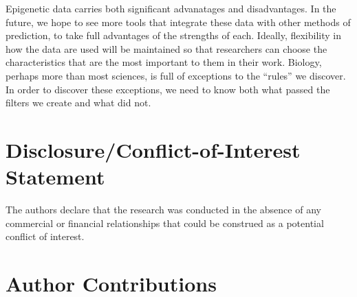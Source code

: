 \documentclass{frontiersENG} %
\begin{document}
Epigenetic data carries both significant advanatages and
disadvantages. In the future, we hope to see more tools that integrate
these data with other methods of prediction, to take full advantages
of the strengths of each. Ideally, flexibility in how the data are
used will be maintained so that researchers can choose the
characteristics that are the most important to them in their
work. Biology, perhaps more than most sciences, is full of exceptions
to the ``rules'' we discover. In order to discover these exceptions,
we need to know both what passed the filters we create and what did
not.


\section*{Disclosure/Conflict-of-Interest Statement}

The authors declare that the research was conducted in the absence of any commercial or financial relationships that could be construed as a potential conflict of interest.

\section*{Author Contributions}
\end{document}

